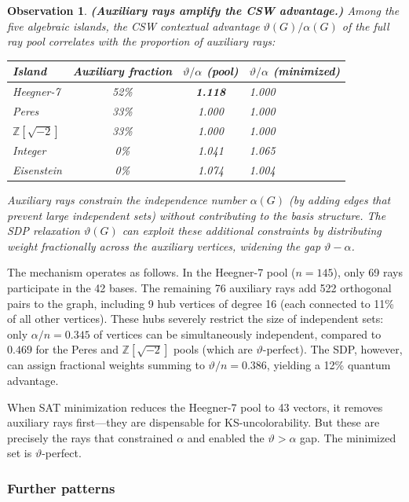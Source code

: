 \documentclass[12pt,a4paper]{article}
\newtheorem{observation}[theorem]{Observation}
\newcommand{\Z}{\mathbb{Z}}
\begin{document}
\begin{observation}\label{obs:auxiliary}
\textbf{(Auxiliary rays amplify the CSW advantage.)} Among the five algebraic islands, the CSW contextual advantage $\vartheta(G)/\alpha(G)$ of the full ray pool correlates with the proportion of auxiliary rays:
\begin{center}
\begin{tabular}{lccl}
\toprule
Island & Auxiliary fraction & $\vartheta/\alpha$ (pool) & $\vartheta/\alpha$ (minimized) \\
\midrule
Heegner-7 & 52\% & \textbf{1.118} & 1.000 \\
Peres & 33\% & 1.000 & 1.000 \\
$\Z[\sqrt{-2}]$ & 33\% & 1.000 & 1.000 \\
Integer & 0\% & 1.041 & 1.065 \\
Eisenstein & 0\% & 1.074 & 1.004 \\
\bottomrule
\end{tabular}
\end{center}
Auxiliary rays constrain the independence number $\alpha(G)$ (by adding edges that prevent large independent sets) without contributing to the basis structure. The SDP relaxation $\vartheta(G)$ can exploit these additional constraints by distributing weight fractionally across the auxiliary vertices, widening the gap $\vartheta - \alpha$.
\end{observation}

The mechanism operates as follows. In the Heegner-7 pool ($n = 145$), only 69 rays participate in the 42 bases. The remaining 76 auxiliary rays add 522 orthogonal pairs to the graph, including 9 hub vertices of degree 16 (each connected to 11\% of all other vertices). These hubs severely restrict the size of independent sets: only $\alpha/n = 0.345$ of vertices can be simultaneously independent, compared to $0.469$ for the Peres and $\Z[\sqrt{-2}]$ pools (which are $\vartheta$-perfect). The SDP, however, can assign fractional weights summing to $\vartheta/n = 0.386$, yielding a 12\% quantum advantage.

When SAT minimization reduces the Heegner-7 pool to 43 vectors, it removes auxiliary rays first---they are dispensable for KS-uncolorability. But these are precisely the rays that constrained $\alpha$ and enabled the $\vartheta > \alpha$ gap. The minimized set is $\vartheta$-perfect.

\subsubsection{Further patterns}
\end{document}
